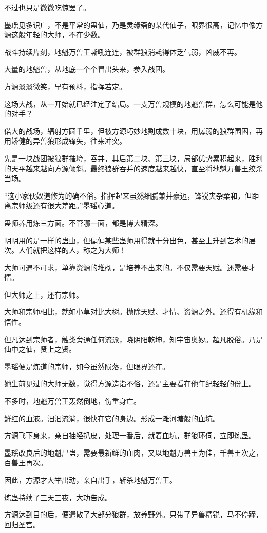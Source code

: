\begin{this_body}
不过也只是微微吃惊罢了。

墨瑶见多识广，不是平常的蛊仙，乃是灵缘斋的某代仙子，眼界很高，记忆中像方源这般年轻的大师，不在少数。

战斗持续片刻，地魁万兽王嘶吼连连，被群狼消耗得体乏气弱，凶威不再。

大量的地魁兽，从地底一个个冒出头来，参入战团。

方源淡淡微笑，早有预料，指挥若定。

这场大战，从一开始就已经注定了结局。一支万兽规模的地魁兽群，怎么可能是他的对手？

偌大的战场，辐射方圆千里，但被方源巧妙地割成数十块，用孱弱的狼群围困，再用矫健的异兽狼形成锋矢，往来冲突。

先是一块战团被狼群摧垮，吞并，其后第二块、第三块，局部优势累积起来，胜利的天平越来越向方源倾斜。最终狼群吞并的速度越来越快，直至将地魁万兽王绞杀当场。

“这小家伙奴道修为的确不俗。指挥起来虽然细腻兼并豪迈，锋锐夹杂柔和，但距离宗师级还有很大差距。”墨瑶心道。

蛊师养用炼三方面。不管哪一面，都是博大精深。

明明用的是一样的蛊虫，但偏偏某些蛊师用得就十分出色，甚至上升到艺术的层次。人们就把这样的人，称之为大师！

大师可遇不可求，单靠资源的堆砌，是培养不出来的。不仅需要天赋。还需要才情。

但大师之上，还有宗师。

大师和宗师相比，就如小草对比大树。抛除天赋、才情、资源之外。还得有机缘和悟性。

但凡达到宗师者，触类旁通任何流派，晓阴阳乾坤，知宇宙奥妙。超凡脱俗。乃是仙中之仙，贤上之贤。

墨瑶便是炼道的宗师，如今虽然陨落，但眼界还在。

她生前见过的大师无数，觉得方源造诣不俗，还是主要看在他年纪轻轻的份上。

不多时，地魁万兽王轰然倒地，伤重身亡。

鲜红的血液。汩汩流淌，很快在它的身边。形成一滩河塘般的血坑。

方源飞下身来，亲自抽经扒皮，处理一番后，就着血坑，群狼环伺，立即炼蛊。

墨瑶改良后的地魁尸蛊，需要最新鲜的血肉，又以地魁万兽王为佳，千兽王次之，百兽王再次。

因此，方源才大举出动，亲自出手，斩杀地魁万兽王。

炼蛊持续了三天三夜，大功告成。

方源达到目的后，便遣散了大部分狼群，放养野外。只带了异兽精锐，马不停蹄，回归圣宫。


\end{this_body}

